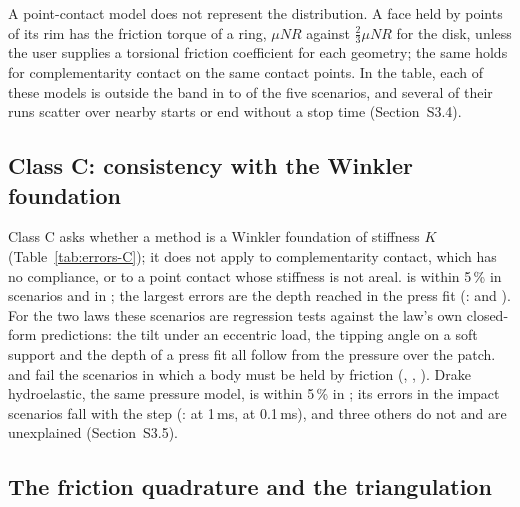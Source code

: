 A point-contact model does not represent the distribution. A face held by points of its
rim has the friction torque of a ring, $\mu N R$ against $\tfrac23\mu N R$ for the disk, unless
the user supplies a torsional friction coefficient for each geometry; the same holds for
complementarity contact on the same contact points. In the table, each of these models is
outside the band in  to  of the five
scenarios, and several of their runs scatter over nearby starts or end without a stop time
(Section~S3.4).



\subsection{Class C: consistency with the Winkler foundation}\label{sec:classC}

Class C asks whether a method is a Winkler foundation of stiffness $K$
(Table~\ref{tab:errors-C}); it does not apply to complementarity contact, which has no
compliance, or to a point contact whose stiffness is not areal.  is within
5\,\% in  scenarios and  in
; the largest errors are the depth reached in the press fit
(:  and ). For the two laws
these scenarios are regression tests against the law's own closed-form predictions: the tilt
under an eccentric load, the tipping angle on a soft support and the depth of a press fit all
follow from the pressure over the patch.  and  fail the scenarios
in which a body must be held by friction (, , ). Drake
hydroelastic, the same pressure model, is within 5\,\% in ; its errors
in the impact scenarios fall with the step (:  at 1\,ms,
 at 0.1\,ms), and three others do not and are unexplained
(Section~S3.5).

\begin{table}[t]
\caption{Class C: error [\%] of the methods that are a Winkler foundation, base variant}
\label{tab:errors-C}
\end{table}

\subsection{The friction quadrature and the triangulation}\label{sec:ablation}

